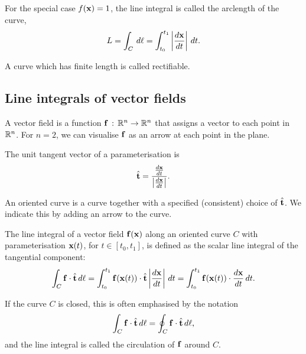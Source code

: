 \documentclass[10pt, a4paper]{article}
\begin{document}
\begin{definition}[Arclength]
    For the special case $f(\mathbf{x}) = 1$,
    the line integral is called the arclength of the curve,
    \[
    L = \int_{C}\,d\ell = \int_{t_0}^{t_1}\left|\frac{d\mathbf{x}}{dt}\right|\,dt.
    \]
\end{definition}

\begin{definition}[Rectifiable]
    A curve which has finite length is called rectifiable.
\end{definition}

\subsection{Line integrals of vector fields}

\begin{definition}
    A vector field is a function $\mathbf{f}\,:\,\mathbb{R} ^ n \to \mathbb{R} ^ n$ that assigns a vector to each point in $\mathbb{R} ^ n$.
    For $n = 2$,
    we can visualise $\mathbf{f}$ as an arrow at each point in the plane.
\end{definition}

\begin{definition}
    The unit tangent vector of a parameterisation is
    \[
    \hat{\mathbf{t}} = \frac{\frac{d\mathbf{x}}{dt}}{\left|\frac{d\mathbf{x}}{dt}\right|}.
    \]
\end{definition}

\begin{definition}
    An oriented curve is a curve together with a specified
    (consistent)
    choice of $\hat{\mathbf{t}}$.
    We indicate this by adding an arrow to the curve.
\end{definition}

The line integral of a vector field $\mathbf{f}(\mathbf{x})$ along an oriented curve $C$ with parameterisation $\mathbf{x}(t)$,
for $t \in [t_0, t_1]$,
is defined as the scalar line integral of the tangential component:
\[
\int_{C}\mathbf{f}\cdot\hat{\mathbf{t}}\,d\ell = \int_{t_0}^{t_1}\mathbf{f}(\mathbf{x}(t))\cdot\hat{\mathbf{t}}\left|\frac{d\mathbf{x}}{dt}\right|\,dt = \int_{t_0}^{t_1}\mathbf{f}(\mathbf{x}(t))\cdot\frac{d\mathbf{x}}{dt}\,dt.
\]

\begin{definition}[Circulation]
    If the curve $C$ is closed,
    this is often emphasised by the notation
    \[
    \int_{C}\mathbf{f}\cdot\hat{\mathbf{t}}\,d\ell = \oint_{C}\mathbf{f}\cdot\hat{\mathbf{t}}\,d\ell,
    \]
    and the line integral is called the circulation of $\mathbf{f}$ around $C$.
\end{definition}
\end{document}
